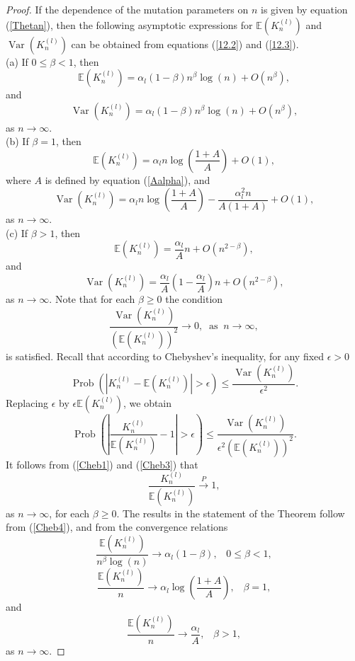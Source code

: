 \documentclass[12pt]{amsart}
\theoremstyle{definition}
\numberwithin{equation}{section}
\DeclareMathOperator{\Prob}{Prob}
\DeclareMathOperator{\Var}{Var}
\begin{document}
\begin{proof}If the dependence of the mutation parameters on $n$ is given by equation (\ref{Thetan}), then the following asymptotic expressions for $\mathbb{E}\left(K_n^{(l)}\right)$ and $\Var\left(K_n^{(l)}\right)$ can be obtained from equations (\ref{12.2}) and (\ref{12.3}).\\
(a) If $0\leq\beta<1$, then
$$
\mathbb{E}\left(K_n^{(l)}\right)=\alpha_l(1-\beta)n^{\beta}\log(n)+O\left(n^{\beta}\right),
$$
and
$$
\Var\left(K_n^{(l)}\right)=\alpha_l(1-\beta)n^{\beta}\log(n)+O\left(n^{\beta}\right),
$$
as $n\rightarrow\infty$.\\
(b) If $\beta=1$, then
$$
\mathbb{E}\left(K_n^{(l)}\right)=\alpha_ln
\log\left(\frac{1+A}{A}\right)+O\left(1\right),
$$
where $A$ is defined by equation (\ref{Aalpha}), and
$$
\Var\left(K_n^{(l)}\right)=\alpha_ln
\log\left(\frac{1+A}{A}\right)-\frac{\alpha_l^2n}{A(1+A)}+O\left(1\right),
$$
as $n\rightarrow\infty$.\\
(c) If $\beta>1$, then
$$
\mathbb{E}\left(K_n^{(l)}\right)=\frac{\alpha_l}{A}n
+O\left(n^{2-\beta}\right),
$$
and
$$
\Var\left(K_n^{(l)}\right)=\frac{\alpha_l}{A}\left(1-\frac{\alpha_l}{A}\right)n
+O\left(n^{2-\beta}\right),
$$
as $n\rightarrow\infty$. Note that for each $\beta\geq 0$ the condition
\begin{equation}\label{Cheb1}
\frac{\Var\left(K_n^{(l)}\right)}{\left(\mathbb{E}\left(K_n^{(l)}\right)\right)^2}
\longrightarrow 0,\;\;\mbox{as}\;\; n\longrightarrow\infty,
\end{equation}
is satisfied. Recall that according to Chebyshev's inequality, for any fixed $\epsilon>0$
$$
\Prob\left(\left|K_n^{(l)}-\mathbb{E}\left(K_n^{(l)}\right)\right|>\epsilon\right)\leq
\frac{\Var\left(K_n^{(l)}\right)}{\epsilon^2}.
$$
Replacing $\epsilon$ by $\epsilon\mathbb{E}\left(K_n^{(l)}\right)$, we obtain
\begin{equation}\label{Cheb3}
\Prob\left(\left|\frac{K_n^{(l)}}{\mathbb{E}\left(K_n^{(l)}\right)}-1\right|>\epsilon\right)\leq
\frac{\Var\left(K_n^{(l)}\right)}{\epsilon^2\left(\mathbb{E}\left(K_n^{(l)}\right)\right)^2}.
\end{equation}
It follows from (\ref{Cheb1}) and (\ref{Cheb3}) that
\begin{equation}\label{Cheb4}
\frac{K_n^{(l)}}{\mathbb{E}\left(K_n^{(l)}\right)}\overset{P}{\longrightarrow} 1,
\end{equation}
as $n\rightarrow\infty$, for each $\beta\geq 0$. The results
in the statement of the Theorem follow from (\ref{Cheb4}), and from the convergence relations
\begin{equation}
\frac{\mathbb{E}\left(K_n^{(l)}\right)}{n^{\beta}\log(n)}
\longrightarrow \alpha_l(1-\beta),\;\;\;  0\leq\beta<1,
\end{equation}
\begin{equation}
\frac{\mathbb{E}\left(K_n^{(l)}\right)}{n}
\longrightarrow \alpha_l\log\left(\frac{1+A}{A}\right),\;\;\;  \beta=1,
\end{equation}
and
\begin{equation}
\frac{\mathbb{E}\left(K_n^{(l)}\right)}{n}
\longrightarrow \frac{\alpha_l}{A},\;\;\;  \beta>1,
\end{equation}
as $n\rightarrow\infty$.
\end{proof}
\end{document}
